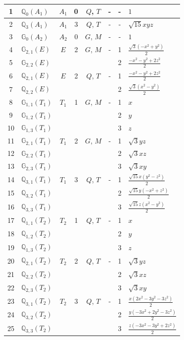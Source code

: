 \documentclass[fleqn,10pt,landscape]{jsarticle}
\begin{document}
\begin{longtable}[l]{clcccccl}
1 & $\mathbb{Q}_{0}(A_{1})$ & $A_{1}$ & 0 & $Q$, $T$ & - & - & $1$ \\ \hline
2 & $\mathbb{Q}_{3}(A_{1})$ & $A_{1}$ & 3 & $Q$, $T$ & - & - & $\sqrt{15} x y z$ \\ \hline
3 & $\mathbb{G}_{0}(A_{2})$ & $A_{2}$ & 0 & $G$, $M$ & - & - & $1$ \\ \hline
4 & $\mathbb{G}_{2,1}(E)$ & $E$ & 2 & $G$, $M$ & - & 1 & $\frac{\sqrt{3} \left(- x^{2} + y^{2}\right)}{2}$ \\
5 & $\mathbb{G}_{2,2}(E)$ &  &  &  &  & 2 & $\frac{- x^{2} - y^{2} + 2 z^{2}}{2}$ \\ \hline
6 & $\mathbb{Q}_{2,1}(E)$ & $E$ & 2 & $Q$, $T$ & - & 1 & $\frac{- x^{2} - y^{2} + 2 z^{2}}{2}$ \\
7 & $\mathbb{Q}_{2,2}(E)$ &  &  &  &  & 2 & $\frac{\sqrt{3} \left(x^{2} - y^{2}\right)}{2}$ \\ \hline
8 & $\mathbb{G}_{1,1}(T_{1})$ & $T_{1}$ & 1 & $G$, $M$ & - & 1 & $x$ \\
9 & $\mathbb{G}_{1,2}(T_{1})$ &  &  &  &  & 2 & $y$ \\
10 & $\mathbb{G}_{1,3}(T_{1})$ &  &  &  &  & 3 & $z$ \\ \hline
11 & $\mathbb{G}_{2,1}(T_{1})$ & $T_{1}$ & 2 & $G$, $M$ & - & 1 & $\sqrt{3} y z$ \\
12 & $\mathbb{G}_{2,2}(T_{1})$ &  &  &  &  & 2 & $\sqrt{3} x z$ \\
13 & $\mathbb{G}_{2,3}(T_{1})$ &  &  &  &  & 3 & $\sqrt{3} x y$ \\ \hline
14 & $\mathbb{Q}_{3,1}(T_{1})$ & $T_{1}$ & 3 & $Q$, $T$ & - & 1 & $\frac{\sqrt{15} x \left(y^{2} - z^{2}\right)}{2}$ \\
15 & $\mathbb{Q}_{3,2}(T_{1})$ &  &  &  &  & 2 & $\frac{\sqrt{15} y \left(- x^{2} + z^{2}\right)}{2}$ \\
16 & $\mathbb{Q}_{3,3}(T_{1})$ &  &  &  &  & 3 & $\frac{\sqrt{15} z \left(x^{2} - y^{2}\right)}{2}$ \\ \hline
17 & $\mathbb{Q}_{1,1}(T_{2})$ & $T_{2}$ & 1 & $Q$, $T$ & - & 1 & $x$ \\
18 & $\mathbb{Q}_{1,2}(T_{2})$ &  &  &  &  & 2 & $y$ \\
19 & $\mathbb{Q}_{1,3}(T_{2})$ &  &  &  &  & 3 & $z$ \\ \hline
20 & $\mathbb{Q}_{2,1}(T_{2})$ & $T_{2}$ & 2 & $Q$, $T$ & - & 1 & $\sqrt{3} y z$ \\
21 & $\mathbb{Q}_{2,2}(T_{2})$ &  &  &  &  & 2 & $\sqrt{3} x z$ \\
22 & $\mathbb{Q}_{2,3}(T_{2})$ &  &  &  &  & 3 & $\sqrt{3} x y$ \\ \hline
23 & $\mathbb{Q}_{3,1}(T_{2})$ & $T_{2}$ & 3 & $Q$, $T$ & - & 1 & $\frac{x \left(2 x^{2} - 3 y^{2} - 3 z^{2}\right)}{2}$ \\
24 & $\mathbb{Q}_{3,2}(T_{2})$ &  &  &  &  & 2 & $\frac{y \left(- 3 x^{2} + 2 y^{2} - 3 z^{2}\right)}{2}$ \\
25 & $\mathbb{Q}_{3,3}(T_{2})$ &  &  &  &  & 3 & $\frac{z \left(- 3 x^{2} - 3 y^{2} + 2 z^{2}\right)}{2}$ \\
\end{longtable}
\end{document}
